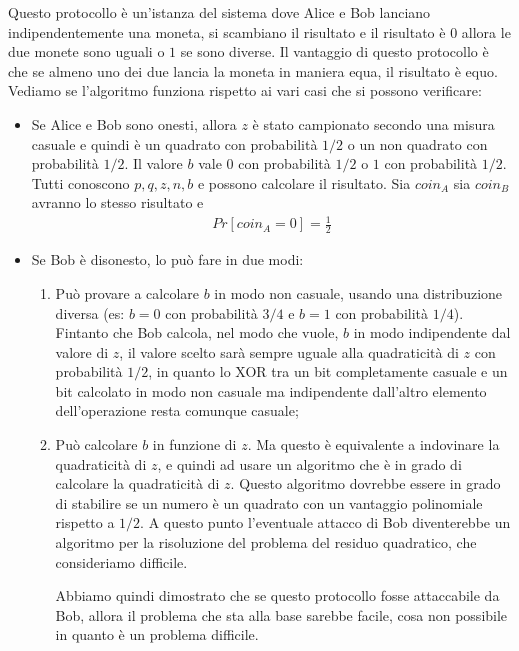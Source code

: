 Questo protocollo è un'istanza del sistema dove Alice e Bob lanciano indipendentemente una moneta, si scambiano il risultato e il risultato è $0$ allora le due monete sono uguali o $1$ se sono diverse. Il vantaggio di questo protocollo è che se almeno uno dei due lancia la moneta in maniera equa, il risultato è equo.
Vediamo se l'algoritmo funziona rispetto ai vari casi che si possono verificare:
\begin{itemize}
    \item Se Alice e Bob sono onesti, allora $z$ è stato campionato secondo una misura casuale e quindi è un quadrato con probabilità $1/2$ o un non quadrato con probabilità $1/2$. Il valore $b$ vale $0$ con probabilità $1/2$ o $1$ con probabilità $1/2$. Tutti conoscono $p, q, z, n, b$ e possono calcolare il risultato. Sia $coin_A$ sia $coin_B$ avranno lo stesso risultato e
    \begin{align*}
        Pr[coin_A = 0] = \frac{1}{2}
    \end{align*}
    \item Se Bob è disonesto, lo può fare in due modi:
    \begin{enumerate}
        \item Può provare a calcolare $b$ in modo non casuale, usando una distribuzione diversa (es: $b=0$ con probabilità $3/4$ e $b=1$ con probabilità $1/4$). Fintanto che Bob calcola, nel modo che vuole, $b$ in modo indipendente dal valore di $z$, il valore scelto sarà sempre uguale alla quadraticità di $z$ con probabilità $1/2$, in quanto lo XOR tra un bit completamente casuale e un bit calcolato in modo non casuale ma indipendente dall'altro elemento dell'operazione resta comunque casuale;
        \item Può calcolare $b$ in funzione di $z$. Ma questo è equivalente a indovinare la quadraticità di $z$, e quindi ad usare un algoritmo che è in grado di calcolare la quadraticità di $z$. Questo algoritmo dovrebbe essere in grado di stabilire se un numero è un quadrato con un vantaggio polinomiale rispetto a $1/2$. A questo punto l'eventuale attacco di Bob diventerebbe un algoritmo per la risoluzione del problema del residuo quadratico, che consideriamo difficile. 
    
        Abbiamo quindi dimostrato che se questo protocollo fosse attaccabile da Bob, allora il problema che sta alla base sarebbe facile, cosa non possibile in quanto è un problema difficile.
    \end{enumerate}


\end{itemize}
